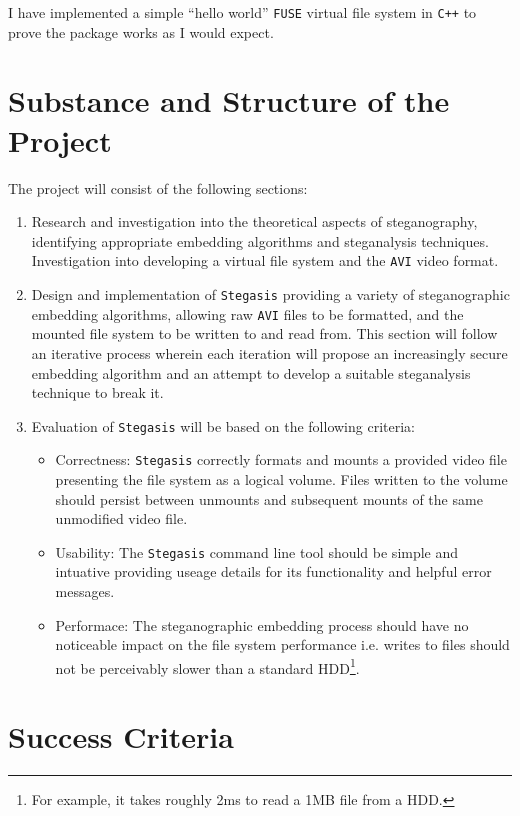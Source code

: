 \documentclass[paper=a4, fontsize=11pt,twoside]{scrartcl}    %
\numberwithin{table}{section}
\numberwithin{figure}{section}
\numberwithin{algorithm}{section}
\begin{document}
I have implemented a simple ``hello world'' \texttt{FUSE} virtual file system in \texttt{C++} to prove the package works as I would expect.

\section*{Substance and Structure of the Project}
The project will consist of the following sections:
\begin{enumerate}
\item Research and investigation into the theoretical aspects of steganography, identifying appropriate embedding algorithms and steganalysis techniques. Investigation into developing a virtual file system and the \texttt{AVI} video format.
\item Design and implementation of \texttt{Stegasis} providing a variety of steganographic embedding algorithms, allowing raw \texttt{AVI} files to be formatted, and the mounted file system to be written to and read from. This section will follow an iterative process wherein each iteration will propose an increasingly secure embedding algorithm and an attempt to develop a suitable steganalysis technique to break it.
\item Evaluation of \texttt{Stegasis} will be based on the following criteria:
    \begin{itemize}
    \item Correctness: \texttt{Stegasis} correctly formats and mounts a provided video file presenting the file system as a logical volume. Files written to the volume should persist between unmounts and subsequent mounts of the same unmodified video file.
    \item Usability: The \texttt{Stegasis} command line tool should be simple and intuative providing useage details for its functionality and helpful error messages.
    \item Performace: The steganographic embedding process should have no noticeable impact on the file system performance i.e. writes to files should not be perceivably slower than a standard HDD\footnote{For example, it takes roughly 2ms to read a 1MB file from a HDD.}.
    \end{itemize}
\end{enumerate}

\section*{Success Criteria}
\end{document}
